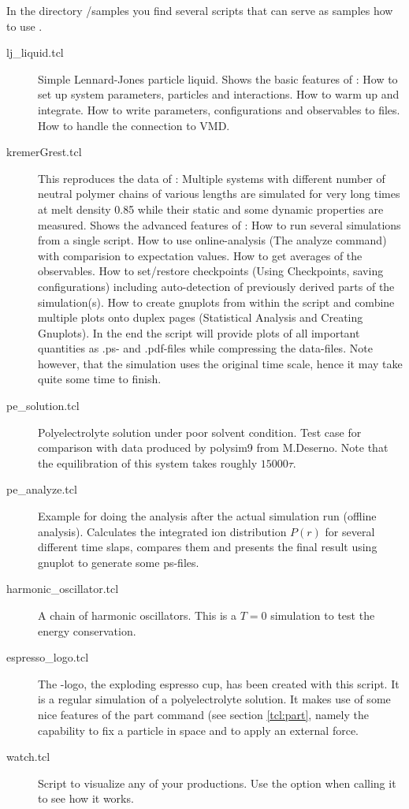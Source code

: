 In the directory \es{}/samples you find several scripts that can serve
as samples how to use \es{}.
\begin{description}
\item[lj\_liquid.tcl] Simple Lennard-Jones particle liquid. Shows the
  basic features of \es: How to set up system parameters, particles
  and interactions. How to warm up and integrate. How to write
  parameters, configurations and observables to files. How to handle
  the connection to VMD.
\item[kremerGrest.tcl] This reproduces the data of \citet{kremer90a}:
  Multiple systems with different number of neutral polymer chains of
  various lengths are simulated for very long times at melt density
  0.85 while their static and some dynamic properties are measured.
  Shows the advanced features of \es{}: How to run several simulations
  from a single script. How to use online-analysis (The analyze
  command) with comparision to expectation values. How to get averages
  of the observables. How to set/restore checkpoints (Using
  Checkpoints, saving configurations) including auto-detection of
  previously derived parts of the simulation(s). How to create
  gnuplots from within the script and combine multiple plots onto
  duplex pages (Statistical Analysis and Creating Gnuplots).  In the
  end the script will provide plots of all important quantities as
  .ps- and .pdf-files while compressing the data-files. Note however,
  that the simulation uses the original time scale, hence it may take
  quite some time to finish.
\item[pe\_solution.tcl] Polyelectrolyte solution under poor solvent
  condition. Test case for comparison with data produced by polysim9
  from M.Deserno. Note that the equilibration of this system takes
  roughly $15000 \tau$.
\item[pe\_analyze.tcl] Example for doing the analysis after the actual
  simulation run (offline analysis). Calculates the integrated ion
  distribution $P(r)$ for several different time slaps, compares them
  and presents the final result using gnuplot to generate some
  ps-files.
\item[harmonic\_oscillator.tcl] A chain of harmonic oscillators. This
  is a $T=0$ simulation to test the energy conservation.
\item[espresso\_logo.tcl] The \es-logo, the exploding espresso cup,
  has been created with this script. It is a regular simulation of a
  polyelectrolyte solution. It makes use of some nice features of the
  part command (see section \vref{tcl:part}, namely the capability to
  fix a particle in space and to apply an external force.
\item[watch.tcl] Script to visualize any of your productions. Use the
   option when calling it to see how it works.
\end{description}

